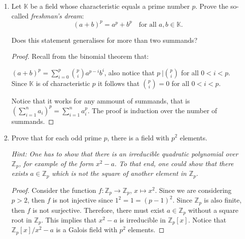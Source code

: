 \documentclass[12pt]{article}
\begin{document}
\begin{enumerate}
    \begin{proof}
        We take the hint and let $f$ as defined previously. Notice that $f$ is a group morphism with respect to the product. Notice that since $R$ is an integral domain, then $\textrm{ker} f = 0$. Therefore $f$ is injective. Since $R$ is finite, then $f$ is bijective. Therefore there exists an element $c$ such that $ac = 1$. This completes the proof that $R$ is a field.
    \end{proof}
    
    \item Let $\mathbb{K}$ be a field whose characteristic equals a prime number $p$. Prove the so-called \emph{freshman's dream}:
    $$ (a+b)^p = a^p + b^p \quad \textrm{for all } a,b \in \mathbb{K}.$$
    
    Does this statement generalises for more than two summands?
    
    \begin{proof}
    Recall from the binomial theorem that: 
    
    $(a+b)^p = \displaystyle \sum \limits_{i=0}^p {p \choose i} a^{p-i}b^i$, also notice that $ \displaystyle p \: \vert {p \choose i}$ for all $0 < i < p$. Since $\mathbb{K}$ is of characteristic $p$ it follows that $\displaystyle{p \choose i} = 0 $ for all $0<i<p$.
    
    Notice that it works for any ammount of summands, that is $\displaystyle \left (\sum \limits_{i=1}^n a_i \right)^p = \displaystyle\sum \limits_{i=1}^n a_i^p $. The proof is induction over the number of summands.
    \end{proof}
    
    \item Prove that for each odd prime $p$, there is a field with $p^2$ elements.
    
    \emph{Hint: One has to show that there is an irreducible quadratic polynomial over $\mathbb{Z}_p$, for example of the form $x^2 -a$. To that end, one could show that there exists $a \in \mathbb{Z}_p$ which is not the square of another element in $\mathbb{Z}_p.$}
    
    \begin{proof}
    Consider the function $f: \mathbb{Z}_p \rightarrow \mathbb{Z}_p$, $x \mapsto x^2$. Since we are considering $p > 2$, then $f$ is not injective since $1^2 = 1 = (p-1)^2$. Since $\mathbb{Z}_p$ is also finite, then $f$ is not surjective. Therefore, there must exist $a \in \mathbb{Z}_p$ without a square root in $\mathbb{Z}_p$. This implies that $x^2 - a$ is irreducible in $\mathbb{Z}_p [x]$. Notice that $\mathbb{Z}_p[x] / x^2 -a$ is a Galois field with $p^2$ elements.
    \end{proof}
    

\end{enumerate}
\end{document}
